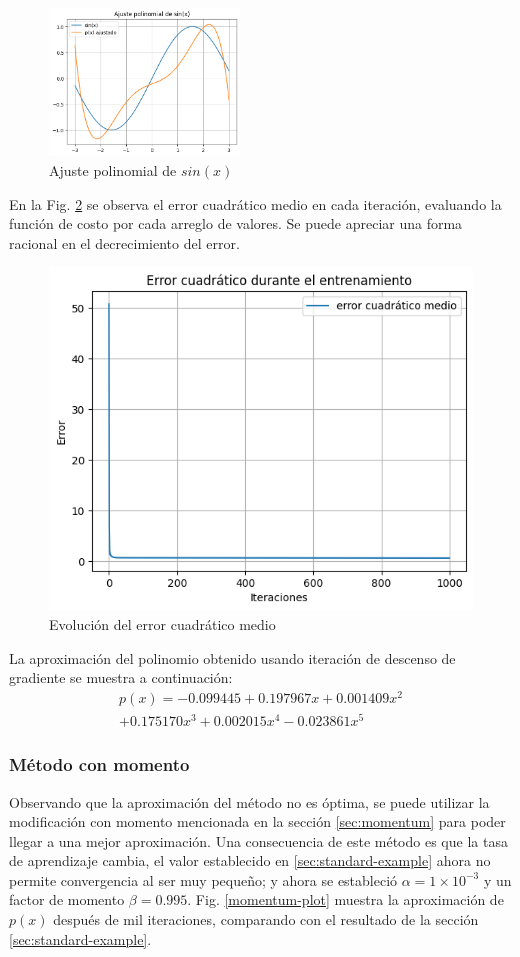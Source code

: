 \documentclass[conference]{IEEEtran}
\begin{document}
\begin{figure}[htbp]
\centerline{\includegraphics[width=0.45\textwidth]{fig1.png}}
\caption{Ajuste polinomial de $sin(x)$}
\label{gradient-plot}
\end{figure}

En la Fig. \ref{gradient-error} se observa el error cuadrático medio en cada iteración, evaluando la función de costo por cada arreglo de valores. Se puede apreciar una forma racional en el decrecimiento del error.

\begin{figure}[htbp]
\centerline{\includegraphics[width=0.45 \textwidth]{fig2.png}}
\caption{Evolución del error cuadrático medio}
\label{gradient-error}
\end{figure}

La aproximación del polinomio obtenido usando iteración de descenso de gradiente se muestra a continuación:
\begin{multline*}
    p(x)=-0.099445+0.197967x+0.001409x^{2} \\
    +0.175170x^{3}+0.002015x^{4}-0.023861x^{5}
\end{multline*}

\subsubsection{Método con momento}\label{sec:momentum-example}
Observando que la aproximación del método no es óptima, se puede utilizar la modificación con momento mencionada en la sección \ref{sec:momentum} para poder llegar a una mejor aproximación. Una consecuencia de este método es que la tasa de aprendizaje cambia, el valor establecido en \ref{sec:standard-example} ahora no permite convergencia al ser muy pequeño; y ahora se estableció $\alpha=1\times10^{-3}$ y un factor de momento $\beta=0.995$. Fig. \ref{momentum-plot} muestra la aproximación de $p(x)$ después de mil iteraciones, comparando con el resultado de la sección \ref{sec:standard-example}.
\end{document}
